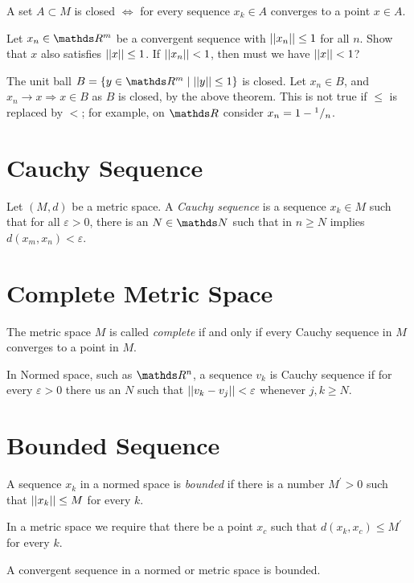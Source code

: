 \documentclass[../main-sheet.tex]{subfiles}
\begin{document}
\begin{thm}
    A set $ A\subset M $ is closed $ \Leftrightarrow $ for every sequence $ x_k\in A $ converges to a point $ x\in A $.
\end{thm}
\begin{prob}
    Let $ x_n\in \R^m $ be a convergent sequence with $ \left\vert\left\vert x_n\right\vert\right\vert\leq 1 $ for all $ n $. Show that $ x $ also satisfies $ \left\vert\left\vert x\right\vert\right\vert\leq 1 $. If $ \left\vert\left\vert x_n\right\vert\right\vert< 1 $, then must we have $ \left\vert\left\vert x\right\vert\right\vert<1 $?
\end{prob}
\begin{soln}
    The unit ball $ B=\set{y\in\R^m \mid \norm{y}\leq 1} $ is closed. Let $ x_n \in B$, and $ x_n\to x \Rightarrow x\in B $ as $ B $ is closed, by the above theorem. This is not true if $ \leq $ is replaced by $ < $; for example, on $ \R $ consider $ x_n=1-{}^{1}/{}_{n} $.
\end{soln}
\section{Cauchy Sequence}
Let $ (M,d) $ be a metric space. A \emph{Cauchy sequence} is a sequence $ x_k\in M $ such that for all $ \varepsilon >0 $, there is an $ N\in\N $ such that in $ n \geq N    $ implies $ d(x_m,x_n)<\varepsilon $.
\section{Complete Metric Space}
The metric space $ M $ is called \emph{complete} if and only if every Cauchy sequence in $ M $ converges to a point in $ M $.

In Normed space, such as $ \R^n $, a sequence $ v_k $ is Cauchy sequence if for every $ \varepsilon >0 $ there us an $ N $ such that $ \left\vert\left\vert v_k-v_j\right\vert\right\vert<\varepsilon $ whenever $ j,k \geq N$.
\section{Bounded Sequence}
A sequence $ x_k $ in a normed space is \emph{bounded} if there is a number $ M^{'}>0 $ such that $ \left\vert\left\vert x_k\right\vert\right\vert\leq M $ for every $ k $.

In a metric space we require that there be a point $ x_c $ such that $ d(x_k,x_c)\leq M^{'} $ for every $ k $.

\begin{thm}
    A convergent sequence in a normed or metric space is bounded.
\end{thm}
\end{document}
